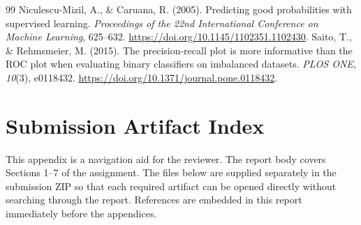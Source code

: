 \documentclass[11pt]{article}
\begin{document}
\begin{thebibliography}{99}
 Niculescu-Mizil, A., \& Caruana, R. (2005). Predicting good probabilities with supervised learning. \textit{Proceedings of the 22nd International Conference on Machine Learning}, 625--632. \url{https://doi.org/10.1145/1102351.1102430}.
 Saito, T., \& Rehmsmeier, M. (2015). The precision-recall plot is more informative than the ROC plot when evaluating binary classifiers on imbalanced datasets. \textit{PLOS ONE, 10}(3), e0118432. \url{https://doi.org/10.1371/journal.pone.0118432}.
\end{thebibliography}

\clearpage
\appendix
\section{Submission Artifact Index}

This appendix is a navigation aid for the reviewer. The report body covers Sections 1--7 of the assignment. The files below are supplied separately in the submission ZIP so that each required artifact can be opened directly without searching through the report. References are embedded in this report immediately before the appendices.
\end{document}
